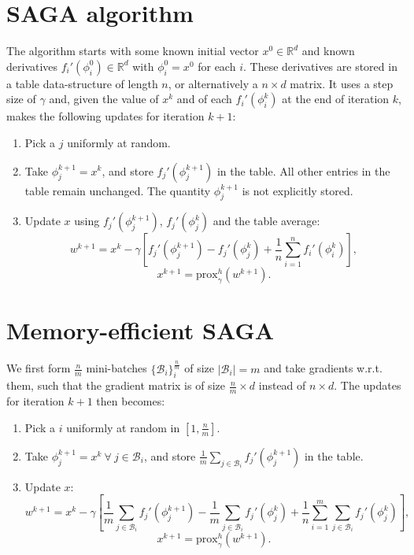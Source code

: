 \documentclass[a4paper,11pt]{article}
\newcommand{\R}{\mathbb{R}}
\newcommand{\B}{\mathcal{B}}
\newcommand{\prox}{\textrm{prox}}
\begin{document}
\section{SAGA algorithm}

The algorithm starts with some known initial vector $x^0 \in \R^d$ and known
derivatives $f_i' (\phi_i^0) \in \R^d$ with $\phi_i^0 = x^0$ for each $i$. These
derivatives are stored in a table data-structure of length $n$, or alternatively
a $n \times d$ matrix. It uses a step size of $\gamma$ and, given the value of
$x^k$ and of each $f_i' (\phi_i^k)$ at the end of iteration $k$, makes the
following updates for iteration $k+1$:
\begin{enumerate}
\item Pick a $j$ uniformly at random.
\item Take $\phi_j^{k+1} = x^k$, and store $f_j'(\phi_j^{k+1})$ in the table.
	All other entries in the table remain unchanged. The quantity $\phi_j^{k+1}$
	is not explicitly stored.
\item Update $x$ using $f_j'(\phi_j^{k+1})$, $f_j'(\phi_j^k)$ and the table
	average:
	\begin{equation} \label{eqn:saga}
	w^{k+1} = x^k - \gamma \left[ f_j'(\phi_j^{k+1}) - f_j'(\phi_j^k)
	+ \frac1n \sum_{i=1}^n f_i'(\phi_i^k) \right] ,
	\end{equation}
	$$x^{k+1} = \prox_\gamma^h (w^{k+1}).$$
\end{enumerate}

\section{Memory-efficient SAGA}

We first form $\frac{n}m$ mini-batches $\{\B_i\}_i^{\frac{n}m}$ of size $|\B_i|
= m$ and take gradients w.r.t. them, such that the gradient matrix is of size
$\frac{n}m \times d$ instead of $n \times d$. The updates for iteration $k+1$
then becomes:
\begin{enumerate}
\item Pick a $i$ uniformly at random in $[1, \frac{n}m]$.
\item Take $\phi_j^{k+1} = x^k \ \forall \ j \in \B_i$, and store $\frac1m
	\sum_{j\in\B_i} f_j'(\phi_j^{k+1})$ in the table.
\item Update $x$:
	\begin{equation} \label{eqn:minisaga}
	w^{k+1} = x^k - \gamma \left[ \frac1m \sum_{j\in\B_i} f_j'(\phi_j^{k+1})
	- \frac1m \sum_{j\in\B_i} f_j'(\phi_j^k)
	+ \frac1n \sum_{i=1}^m \sum_{j\in\B_i} f_j'(\phi_j^k) \right] ,
	\end{equation}
	$$x^{k+1} = \prox_\gamma^h (w^{k+1}).$$
\end{enumerate}
\end{document}
